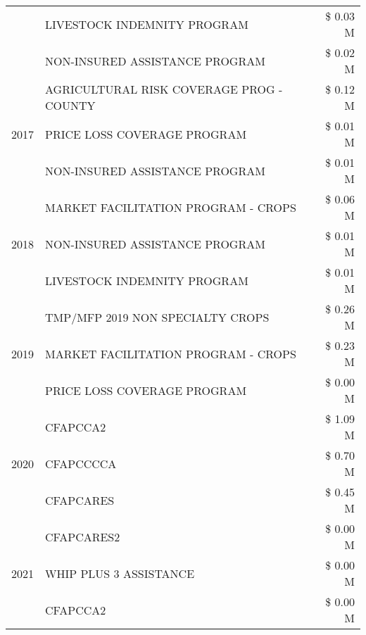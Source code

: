 \begin{tabular}{llr}
 & LIVESTOCK INDEMNITY PROGRAM & \$ 0.03 M \\
 & NON-INSURED ASSISTANCE PROGRAM & \$ 0.02 M \\
\cline{1-3}
\multirow[t]{3}{*}{2017} & AGRICULTURAL RISK COVERAGE PROG - COUNTY & \$ 0.12 M \\
 & PRICE LOSS COVERAGE PROGRAM & \$ 0.01 M \\
 & NON-INSURED ASSISTANCE PROGRAM & \$ 0.01 M \\
\cline{1-3}
\multirow[t]{3}{*}{2018} & MARKET FACILITATION PROGRAM - CROPS & \$ 0.06 M \\
 & NON-INSURED ASSISTANCE PROGRAM & \$ 0.01 M \\
 & LIVESTOCK INDEMNITY PROGRAM & \$ 0.01 M \\
\cline{1-3}
\multirow[t]{3}{*}{2019} & TMP/MFP 2019 NON SPECIALTY CROPS & \$ 0.26 M \\
 & MARKET FACILITATION PROGRAM - CROPS & \$ 0.23 M \\
 & PRICE LOSS COVERAGE PROGRAM & \$ 0.00 M \\
\cline{1-3}
\multirow[t]{3}{*}{2020} & CFAPCCA2 & \$ 1.09 M \\
 & CFAPCCCCA & \$ 0.70 M \\
 & CFAPCARES & \$ 0.45 M \\
\cline{1-3}
\multirow[t]{3}{*}{2021} & CFAPCARES2 & \$ 0.00 M \\
 & WHIP PLUS 3 ASSISTANCE & \$ 0.00 M \\
 & CFAPCCA2 & \$ 0.00 M \\
\cline{1-3}
\bottomrule
\end{tabular}
